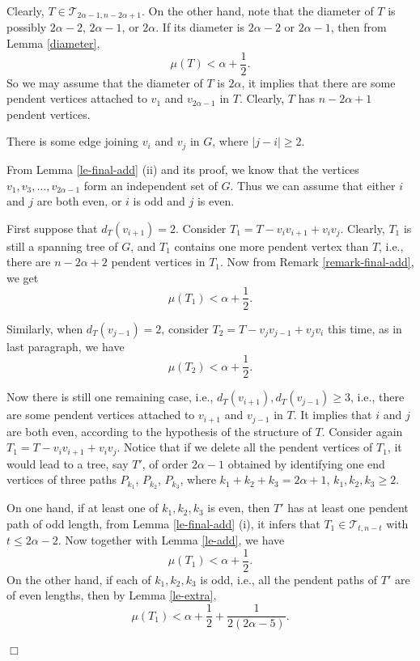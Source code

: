 \documentclass[12pt]{article}
\newenvironment {Proof} {\noindent {\bf Proof.}}{\hspace*{\fill}$\Box$\par\vspace{4mm}}
\begin{document}
\begin{Proof}
Clearly, $T \in \mathcal{T}_{2\alpha-1,n - 2\alpha + 1}$.
On the other hand, note that the diameter of $T$ is possibly $2\alpha - 2$, $2\alpha - 1$, or $2\alpha$. If its diameter is $2\alpha - 2$ or $2\alpha - 1$, then
from Lemma \ref{diameter},
$$
\mu (T) < \alpha + \frac{1}{2}.
$$
So we may assume that the diameter of $T$ is $2\alpha$, it implies that there are some pendent vertices attached to $v_1$ and $v_{2\alpha-1}$ in $T$. Clearly, $T$ has $n - 2\alpha + 1$ pendent vertices.

 There is some edge joining $v_i$ and $v_j$ in $G$, where $|j - i| \ge 2$.


From Lemma \ref{le-final-add} (ii) and its proof, we know that the vertices $v_1, v_3, \dots, v_{2\alpha - 1}$ form an independent set of $G$. Thus we can assume that either $i$ and $j$ are both even, or $i$ is odd and $j$ is even.

First suppose that $d_T(v_{i+1}) = 2$. Consider $T_1 = T - v_i v_{i+1} + v_i v_j$. Clearly, $T_1$ is still a spanning tree of $G$, and $T_1$ contains one more pendent vertex than $T$, i.e., there are $n - 2\alpha + 2$ pendent vertices in $T_1$. Now from Remark \ref{remark-final-add}, we get
$$
\mu (T_1) < \alpha + \frac{1}{2}.
$$

Similarly, when $d_T(v_{j-1}) = 2$, consider $T_2 = T - v_j v_{j-1} + v_j v_i$ this time, as in last paragraph, we have
$$
\mu (T_2) < \alpha + \frac{1}{2}.
$$

Now there is still one remaining case, i.e., $d_T(v_{i+1}), d_T(v_{j-1}) \ge 3$, i.e., there are some pendent vertices attached to $v_{i+1}$ and $v_{j-1}$ in $T$. It implies that $i$ and $j$ are both even, according to the hypothesis of the structure of $T$. Consider again $T_1 = T - v_i v_{i+1} + v_i v_j$. Notice that if we delete all the pendent vertices of $T_1$, it would lead to a tree, say $T'$, of order $2\alpha-1$ obtained by identifying one end vertices of three paths $P_{k_1}$, $P_{k_2}$, $P_{k_3}$, where $k_1 + k_2 + k_3 = 2\alpha + 1$, $k_1, k_2, k_3 \ge 2$.



On one hand, if at least one of $k_1, k_2, k_3$ is even, then $T'$ has at least one pendent path of odd length, from Lemma \ref{le-final-add} (i), it infers that $T_1 \in \mathcal{T}_{t,n - t}$ with $t \le 2\alpha-2$. Now together with Lemma \ref{le-add},
we have
$$
\mu (T_1) < \alpha + \frac{1}{2}.
$$
On the other hand, if each of $k_1, k_2, k_3$ is odd, i.e., all the pendent paths of $T'$ are of even lengths, then by Lemma \ref{le-extra},
$$
\mu (T_1) < \alpha + \frac{1}{2} + \frac{1}{2(2\alpha-5)}.
$$




\end{Proof}
\end{document}
